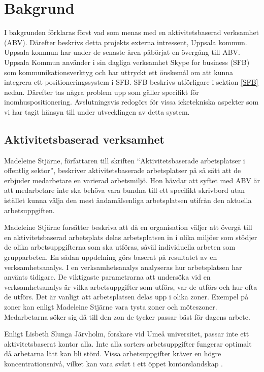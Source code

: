 \documentclass[a4paper,12pt]{article}
\begin{document}
 \section{Bakgrund}
 I bakgrunden förklaras först vad som menas med en aktivitetsbaserad verksamhet (ABV). Därefter beskrivs detta projekts externa intressent, Uppsala kommun. Uppsala kommun har under de senaste åren påbörjat en övergång till ABV. Uppsala Kommun använder i sin dagliga verksamhet Skype for business (SFB) som kommunikationsverktyg och har uttryckt ett önskemål om att kunna integrera ett positioneringssystem i SFB. SFB beskrivs utförligare i sektion \ref{SFB} nedan. Därefter tas några problem upp som gäller specifikt för inomhuspositionering. Avslutningsvis redogörs för vissa icketekniska aspekter som vi har tagit hänsyn till under utvecklingen av detta system.


 \subsection{Aktivitetsbaserad verksamhet}
 Madeleine Stjärne, författaren till skriften ``Aktivitetsbaserade
 arbetsplatser i offentlig sektor''\cite{ABV}, beskriver aktivitetsbaserade arbetsplatser på så sätt att de erbjuder medarbetare en varierad arbetsmiljö. Hon hävdar att syftet med ABV är att medarbetare inte ska behöva vara bundna till ett specifikt skrivbord utan istället kunna välja den mest ändamålsenliga arbetsplatsen utifrån den aktuella arbetsuppgiften. %

 Madeleine Stjärne forsätter beskriva att då en organisation väljer att övergå till en aktivitetsbaserad arbetsplats delas arbetsplatsen in i olika miljöer som stödjer de olika arbetsuppgifterna som ska utföras, såväl individuella arbeten som grupparbeten. En sådan uppdelning görs baserat på resultatet av en verksamhetsanalys. I en verksamhetsanalys analyseras hur arbetsplatsen har använts tidigare. De viktigaste parametrarna att undersöka vid en verksamhetsanalys är vilka arbetsuppgifter som utförs, var de utförs och hur ofta de utförs. Det är vanligt att arbetsplatsen delas upp i olika zoner. Exempel på zoner kan enligt Madeleine Stjärne vara tysta zoner och möteszoner. Medarbetarna söker sig då till den zon de tycker passar bäst för dagens arbete\cite{ABV}.

 Enligt Lisbeth Slunga Järvholm, forskare vid Umeå universitet, passar inte ett aktivitetsbaserat kontor alla. Inte alla sorters arbetsuppgifter fungerar optimalt då arbetarna lätt kan bli störd. Vissa arbetsuppgifter kräver en högre koncentrationsnivå, vilket kan vara svårt i ett öppet kontorslandskap \cite{passarInteAlla}.
\end{document}
